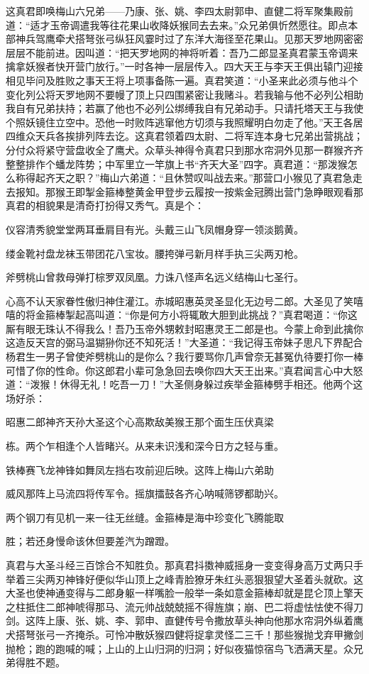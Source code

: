 \documentclass[12pt,UTF8]{ctexbook}
\begin{document}
{这真君即唤梅山六兄弟——乃康、张、姚、李四太尉郭申、直健二将军聚集殿前道：“适才玉帝调遣我等往花果山收降妖猴同去去来。”众兄弟俱忻然愿往。即点本部神兵驾鹰牵犬搭弩张弓纵狂风霎时过了东洋大海径至花果山。见那天罗地网密密层层不能前进。因叫道：“把天罗地网的神将听着：吾乃二郎显圣真君蒙玉帝调来擒拿妖猴者快开营门放行。”一时各神一层层传入。四大天王与李天王俱出辕门迎接相见毕问及胜败之事天王将上项事备陈一遍。真君笑道：“小圣来此必须与他斗个变化列公将天罗地网不要幔了顶上只四围紧密让我赌斗。若我输与他不必列公相助我自有兄弟扶持；若赢了他也不必列公绑缚我自有兄弟动手。只请托塔天王与我使个照妖镜住立空中。恐他一时败阵逃窜他方切须与我照耀明白勿走了他。”天王各居四维众天兵各挨排列阵去讫。这真君领着四太尉、二将军连本身七兄弟出营挑战；分付众将紧守营盘收全了鹰犬。众草头神得令真君只到那水帘洞外见那一群猴齐齐整整排作个蟠龙阵势；中军里立一竿旗上书“齐天大圣”四字。真君道：“那泼猴怎么称得起齐天之职？”梅山六弟道：“且休赞叹叫战去来。”那营口小猴见了真君急走去报知。那猴王即掣金箍棒整黄金甲登步云履按一按紫金冠腾出营门急睁眼观看那真君的相貌果是清奇打扮得又秀气。真是个：

仪容清秀貌堂堂两耳垂肩目有光。头戴三山飞凤帽身穿一领淡鹅黄。

缕金靴衬盘龙袜玉带团花八宝妆。腰挎弹弓新月样手执三尖两刃枪。

斧劈桃山曾救母弹打棕罗双凤凰。力诛八怪声名远义结梅山七圣行。

心高不认天家眷性傲归神住灌江。赤城昭惠英灵圣显化无边号二郎。大圣见了笑嘻嘻的将金箍棒掣起高叫道：“你是何方小将辄敢大胆到此挑战？”真君喝道：“你这厮有眼无珠认不得我么！吾乃玉帝外甥敕封昭惠灵王二郎是也。今蒙上命到此擒你这造反天宫的弼马温猢狲你还不知死活！”大圣道：“我记得玉帝妹子思凡下界配合杨君生一男子曾使斧劈桃山的是你么？我行要骂你几声曾奈无甚冤仇待要打你一棒可惜了你的性命。你这郎君小辈可急急回去唤你四大天王出来。”真君闻言心中大怒道：“泼猴！休得无礼！吃吾一刀！”大圣侧身躲过疾举金箍棒劈手相还。他两个这场好杀：

昭惠二郎神齐天孙大圣这个心高欺敌美猴王那个面生压伏真梁

栋。两个乍相逢个人皆睹兴。从来未识浅和深今日方之轻与重。

铁棒赛飞龙神锋如舞凤左挡右攻前迎后映。这阵上梅山六弟助

威风那阵上马流四将传军令。摇旗擂鼓各齐心呐喊筛锣都助兴。

两个钢刀有见机一来一往无丝缝。金箍棒是海中珍变化飞腾能取

胜；若还身慢命该休但要差汽为蹭蹬。

真君与大圣斗经三百馀合不知胜负。那真君抖擞神威摇身一变变得身高万丈两只手举着三尖两刃神锋好便似华山顶上之峰青脸獠牙朱红头恶狠狠望大圣着头就砍。这大圣也使神通变得与二郎身躯一样嘴脸一般举一条如意金箍棒却就是昆仑顶上擎天之柱抵住二郎神唬得那马、流元帅战兢兢摇不得旌旗；崩、巴二将虚怯怯使不得刀剑。这阵上康、张、姚、李、郭申、直健传号令撒放草头神向他那水帘洞外纵着鹰犬搭弩张弓一齐掩杀。可怜冲散妖猴四健将捉拿灵怪二三千！那些猴抛戈弃甲撇剑抛枪；跑的跑喊的喊；上山的上山归洞的归洞；好似夜猫惊宿鸟飞洒满天星。众兄弟得胜不题。

}
\end{document}

